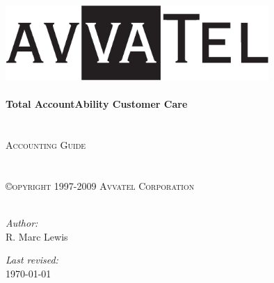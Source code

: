 \begin{titlepage}
\begin{center}
\includegraphics[width=100mm]{figures/avvatel-logo.eps} \\
\ \\ %
%
%
{\huge \bfseries
Total AccountAbility Customer Care
\\}
\textsc{\Large
%
\ \\
\ \\
Accounting Guide\\}
\textsc{\large
\ \\
\ \\
{\copyright}opyright 1997-2009 Avvatel Corporation
}
\ \\
\ \\
\vfill %
\begin{minipage}{0.4\textwidth}
\begin{flushleft} \large
\emph{Author:}\\
R. Marc Lewis\\
\end{flushleft}
\end{minipage}
%
\begin{minipage}{0.4\textwidth}
\begin{flushright} \large
\emph{Last revised:} \\
\today\\
\footnotesize{\ }
\end{flushright}
\end{minipage}
%
%
%
\end{center}
\end{titlepage}

